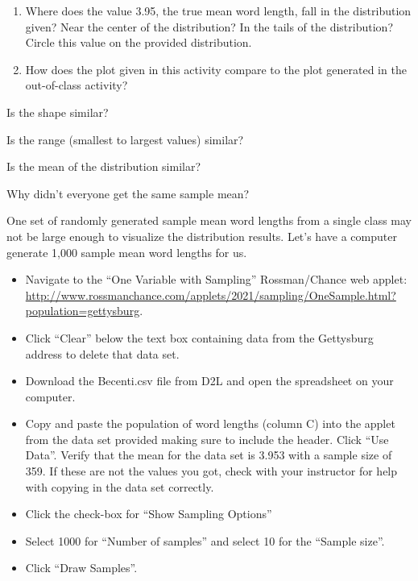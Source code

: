 \documentclass[
]{report}
\newcommand{\rgi}{\hspace{24pt}}  %
\begin{document}
\newpage

\begin{enumerate}
\def\labelenumi{\arabic{enumi}.}
\setcounter{enumi}{2}
\item
  Where does the value 3.95, the true mean word length, fall in the distribution given? Near the center of the distribution? In the tails of the distribution? Circle this value on the provided distribution.
  \vspace{0.3in}
\item
  How does the plot given in this activity compare to the plot generated in the out-of-class activity?
\end{enumerate}

\rgi Is the shape similar?\\
\vspace{0.2in}

\rgi Is the range (smallest to largest values) similar?

\vspace{0.2in}

\rgi Is the mean of the distribution similar?

\vspace{0.2in}

\rgi Why didn't everyone get the same sample mean?
\vspace{0.4in}

One set of randomly generated sample mean word lengths from a single class may not be large enough to visualize the distribution results. Let's have a computer generate 1,000 sample mean word lengths for us.

\begin{itemize}
\item
  Navigate to the ``One Variable with Sampling'' Rossman/Chance web applet: \url{http://www.rossmanchance.com/applets/2021/sampling/OneSample.html?population=gettysburg}.
\item
  Click ``Clear'' below the text box containing data from the Gettysburg address to delete that data set.
\item
  Download the Becenti.csv file from D2L and open the spreadsheet on your computer.
\item
  Copy and paste the population of word lengths (column C) into the applet from the data set provided making sure to include the header. Click ``Use Data''. Verify that the mean for the data set is 3.953 with a sample size of 359. If these are not the values you got, check with your instructor for help with copying in the data set correctly.
\item
  Click the check-box for ``Show Sampling Options''
\item
  Select 1000 for ``Number of samples'' and select 10 for the ``Sample size''.
\item
  Click ``Draw Samples''.
\end{itemize}
\end{document}
